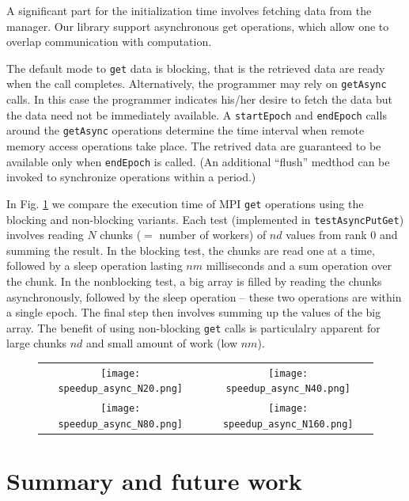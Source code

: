 \documentclass[a4paper,oneside,12pt]{article}
\begin{document}
A significant part for the initialization time involves fetching data from the manager. 
Our library support asynchronous get operations, which allow one to 
overlap communication with computation. 

The default mode to \verb|get| data is blocking, that is the retrieved data are ready when the call
completes. Alternatively, the programmer may rely on \verb|getAsync| calls. In this case the programmer 
indicates his/her desire to fetch the data but the data need not be immediately available. A \verb|startEpoch|
and \verb|endEpoch| calls around the \verb|getAsync| operations determine the time interval 
when remote memory access operations take place. The retrived data are guaranteed to be available only when
\verb|endEpoch| is called. (An additional ``flush'' medthod can be invoked
to synchronize operations within a period.)

In Fig. \ref{fig:async} we compare the  execution time of MPI \verb|get| operations using 
the blocking and non-blocking variants. Each test (implemented in \verb|testAsyncPutGet|) involves reading $N$ chunks ($=$ number of workers) 
of $nd$ values from rank 0 and summing the result. In the blocking test, the chunks are read one at a 
time, followed by a sleep operation lasting $nm$ milliseconds and a sum operation over the chunk. 
In the nonblocking test, a big array is filled by reading the chunks asynchronously, followed by the 
sleep operation -- these two operations are within a single epoch. The final step then involves summing up the values
of the big array. The benefit of using non-blocking \verb|get| calls is particulalry apparent for large chunks 
$nd$ and small amount of work (low $nm$).

\begin{figure}
\begin{tabular}{|c|c|}
      \texttt{[image: speedup\_async\_N20.png]} & \texttt{[image: speedup\_async\_N40.png]} \\
      \texttt{[image: speedup\_async\_N80.png]} & \texttt{[image: speedup\_async\_N160.png]} \\
\end{tabular}
\label{fig:async}
\end{figure}


\section{Summary and future work}
   
\end{document}
